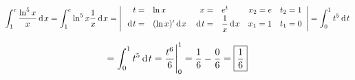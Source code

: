 {}

$$
  \int^e_1 \dfrac{\ln^5x}{x}\d{x}
= \int^e_1 \ln^5x \dfrac{1}{x}\d{x}
=
\Bigg |
  \begin{array}{rl rl r r}
    t =& \ln{x}               & x = & e^t &x_2 =e & t_2 = 1 \\
    \d{t} = & (\ln{x})'\d{x}  & \d{t} = & \dfrac{1}{x}\d{x}&x_1 =1 & t_1 = 0 \\
  \end{array}
\Bigg |
= \int^1_0 t^5\d{t}
$$

$$
= \int^1_0 t^5\d{t}
= \dfrac{t^6}{6} \Bigg |^1_0
= \dfrac{1}{6} - \dfrac{0}{6}
= \boxed{\dfrac{1}{6}}
$$
